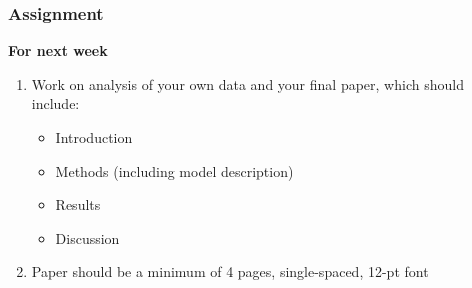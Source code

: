 \documentclass[color=usenames,dvipsnames]{beamer}
\begin{document}
\begin{frame}
  \frametitle{Assignment}
  {\bf \large For next week}
  \begin{enumerate}[\bf (1)]
    \item Work on analysis of your own data and your final paper, which should include:
      \begin{itemize}
        \item Introduction
        \item Methods (including model description)
        \item Results
        \item Discussion
      \end{itemize}
    \item Paper should be a minimum of 4 pages, single-spaced, 12-pt font
  \end{enumerate}
\end{frame}
\end{document}
